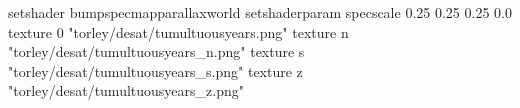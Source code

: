 setshader bumpspecmapparallaxworld
setshaderparam specscale 0.25 0.25 0.25 0.0
texture 0 "torley/desat/tumultuousyears.png"
texture n "torley/desat/tumultuousyears_n.png"
texture s "torley/desat/tumultuousyears_s.png"
texture z "torley/desat/tumultuousyears_z.png"

